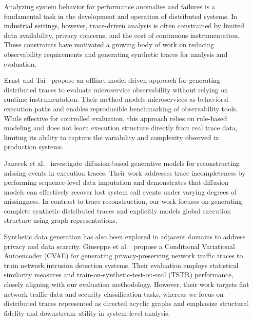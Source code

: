 \documentclass[sigconf,review]{acmart}
\begin{document}
Analyzing system behavior for performance anomalies and failures is a fundamental task in the development and operation of distributed systems. In industrial settings, however, trace-driven analysis is often constrained by limited data availability, privacy concerns, and the cost of continuous instrumentation. These constraints have motivated a growing body of work on reducing observability requirements and generating synthetic traces for analysis and evaluation.

Ernst and Tai~\cite{ernst2021offline} propose an offline, model-driven approach for generating distributed traces to evaluate microservice observability without relying on runtime instrumentation. Their method models microservices as behavioral execution paths and enables reproducible benchmarking of observability tools. While effective for controlled evaluation, this approach relies on rule-based modeling and does not learn execution structure directly from real trace data, limiting its ability to capture the variability and complexity observed in production systems.

Janecek et al.~\cite{janecek2025execution} investigate diffusion-based generative models for reconstructing missing events in execution traces. Their work addresses trace incompleteness by performing sequence-level data imputation and demonstrates that diffusion models can effectively recover lost system call events under varying degrees of missingness. In contrast to trace reconstruction, our work focuses on generating complete synthetic distributed traces and explicitly models global execution structure using graph representations.

Synthetic data generation has also been explored in adjacent domains to address privacy and data scarcity. Giuseppe et al.~\cite{giuseppe2024synthetic} propose a Conditional Variational Autoencoder (CVAE) for generating privacy-preserving network traffic traces to train network intrusion detection systems. Their evaluation employs statistical similarity measures and train-on-synthetic-test-on-real (TSTR) performance, closely aligning with our evaluation methodology. However, their work targets flat network traffic data and security classification tasks, whereas we focus on distributed traces represented as directed acyclic graphs and emphasize structural fidelity and downstream utility in system-level analysis.
\end{document}
